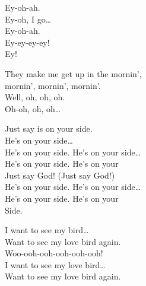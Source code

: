 Ey-oh-ah. \\
Ey-oh, I go… \\

Ey-oh-ah. \\
Ey-ey-ey-ey! \\

Ey! \\




They make me get up in the mornin', \\
mornin', mornin', mornin'. \\

Well, oh, oh, oh. \\
Oh-oh, oh, oh… \\




Just say  is on your side. \\
He's on your side… \\

He's on your side. He's on your side… \\
He's on your side. He's on your \\

Just say God! (Just say God!) \\

He's on your side. He's on your side… \\
He's on your side. He's on your \\
Side. \\




I want to see my  bird… \\
Want to see my love bird again. \\

Woo-ooh-ooh-ooh-ooh-ooh! \\

I want to see my love bird… \\
Want to see my love bird again. \\


